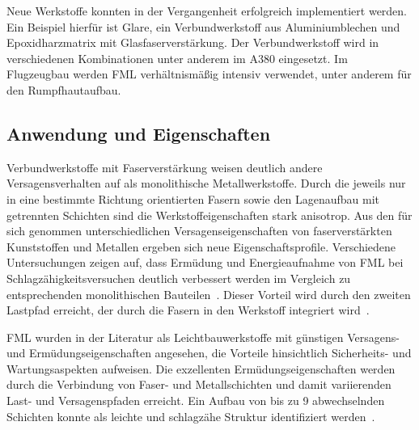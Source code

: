 Neue Werkstoffe konnten in der Vergangenheit erfolgreich implementiert werden.
Ein Beispiel hierfür ist Glare, ein Verbundwerkstoff aus Aluminiumblechen und Epoxidharzmatrix mit Glasfaserverstärkung.
Der Verbundwerkstoff wird in verschiedenen Kombinationen unter anderem im A380 eingesetzt.
Im Flugzeugbau werden FML verhältnismäßig intensiv verwendet, unter anderem für den Rumpfhautaufbau\cite{Airbus2005,Vlot2001}.

\subsection{Anwendung und Eigenschaften}\label{subsec:anwendung}

Verbundwerkstoffe mit Faserverstärkung weisen deutlich andere Versagensverhalten auf als monolithische Metallwerkstoffe.
Durch die jeweils nur in eine bestimmte Richtung orientierten Fasern sowie den Lagenaufbau mit getrennten Schichten sind die Werkstoffeigenschaften stark anisotrop.
Aus den für sich genommen unterschiedlichen Versagenseigenschaften von faserverstärkten Kunststoffen und Metallen ergeben sich neue Eigenschaftsprofile.
Verschiedene Untersuchungen zeigen auf, dass Ermüdung und Energieaufnahme von FML bei Schlagzähigkeitsversuchen deutlich verbessert werden im Vergleich zu entsprechenden monolithischen Bauteilen~\cite{Cortes2005,Botelho2006}.
Dieser Vorteil wird durch den zweiten Lastpfad erreicht, der durch die Fasern in den Werkstoff integriert wird~\cite{Beumler2004}.

FML wurden in der Literatur als Leichtbauwerkstoffe mit günstigen Versagens- und Ermüdungseigenschaften angesehen, die Vorteile hinsichtlich Sicherheits- und Wartungsaspekten aufweisen.
Die exzellenten Ermüdungseigenschaften werden durch die Verbindung von Faser- und Metallschichten und damit variierenden Last- und Versagenspfaden erreicht.
Ein Aufbau von bis zu 9 abwechselnden Schichten konnte als leichte und schlagzähe Struktur identifiziert werden~\cite{Paernaenen2012}.

